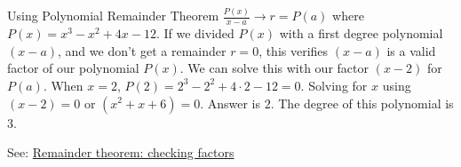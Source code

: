 \documentclass{article}
\begin{document}
Using Polynomial Remainder Theorem $\frac{P(x)}{x-a}\xrightarrow{} r=P(a)$ where $P(x) = x^{3}-x^{2}+4x-12$. If we divided $P(x)$ with a first degree polynomial $(x-a)$, and we don't get a remainder $r=0$, this verifies $(x-a)$ is a valid factor of our polynomial $P(x)$. We can solve this with our factor $(x-2)$ for $P(a)$. When $x=2$, $P(2)=2^{3}-2^{2}+4\cdot2-12=0$. Solving for $x$ using $(x-2)=0$ or $(x^{2}+x+6)=0$. Answer is $2$. The degree of this polynomial is $3$.

See: \href{https://www.khanacademy.org/math/algebra2/x2ec2f6f830c9fb89:poly-div/x2ec2f6f830c9fb89:remainder-theorem/v/polynomial-remainder-theorem-to-test-factor}{Remainder theorem: checking factors}
\end{document}
